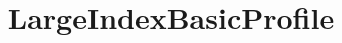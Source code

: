 \documentclass{test}
\begin{document}
\title{LargeIndexBasicProfile} \maketitle \noindent




\end{document}
